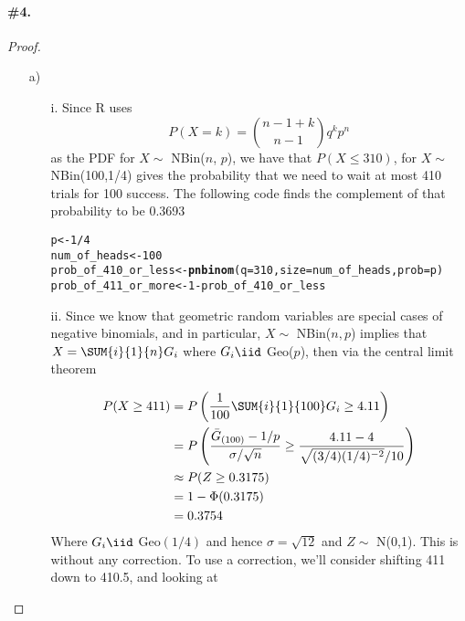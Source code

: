 \documentclass[12pt,titlepage]{article}\usepackage{graphicx, color}
\makeatletter
\newcommand{\hlfunctioncall}[1]{\textcolor[rgb]{0.501960784313725,0,0.329411764705882}{\textbf{#1}}}%
\newenvironment{kframe}{%
 \def\at@end@of@kframe{}%
 \ifinner\ifhmode%
  \def\at@end@of@kframe{\end{minipage}}%
  \begin{minipage}{\columnwidth}%
 \fi\fi%
 \def\FrameCommand##1{\hskip\@totalleftmargin \hskip-\fboxsep
 \colorbox{shadecolor}{##1}\hskip-\fboxsep
     \hskip-\linewidth \hskip-\@totalleftmargin \hskip\columnwidth}%
 \MakeFramed {\advance\hsize-\width
   \@totalleftmargin\z@ \linewidth\hsize
   \@setminipage}}%
 {\par\unskip\endMakeFramed%
 \at@end@of@kframe}
\newenvironment{knitrout}{}{} %
\makeatother
\begin{document}
\paragraph{\#4.}
\begin{proof}
\begin{enumerate}
\item[a)] 




  \begin{enumerate}
	  \item[i.] Since R uses 
    \[
    P(X = k) = \binom{n-1+k}{n-1} q^{k} p^{n}
    \]
    as the PDF for $X \sim$ NBin($n$, $p$), we have that $P(X \leq 310)$, for $X \sim$ NBin(100,1/4) gives the probability that we need to wait at most 410 trials for 100 success. The following code finds the complement of that probability to be 0.3693 
    
\begin{knitrout}
\color{fgcolor}\begin{kframe}
\begin{alltt}
p <- 1/4
num_of_heads <- 100
prob_of_410_or_less <- \hlfunctioncall{pnbinom}(q=310,size=num_of_heads,prob=p)
prob_of_411_or_more <- 1 - prob_of_410_or_less
\end{alltt}
\end{kframe}
\end{knitrout}

    
	\item[ii.] Since we know that geometric random variables are special cases of negative binomials, and in particular, $X \sim$ NBin($n,p$) implies that $X = \SUM{i}{1}{n} G_i$ where $G_i \iid$ Geo($p$), then via the central limit theorem
  


  
	\begin{align*}
	P( X \geq 411 ) &= P\left( \frac{1}{100} \SUM{i}{1}{100} G_i \geq 4.11 \right) \\
	&= P\left( \frac{\bar{G}_{(100)} - 1/p}{\sigma/\sqrt{n}} \geq \frac{4.11 - 4}{\sqrt{(3/4)(1/4)^{-2}}/10} \right) \\
	&\approx P(Z \geq 0.3175) \\
	&= 1-\Phi(0.3175) \\
	&= 0.3754
	\end{align*}
	Where $G_i \iid$ Geo$(1/4)$ and hence $\sigma = \sqrt{12}$ and $Z \sim$ N(0,1). This is without any correction. To use a correction, we'll consider shifting 411 down to 410.5, and looking at 



\end{enumerate}
\end{enumerate}
\end{proof}
\end{document}
